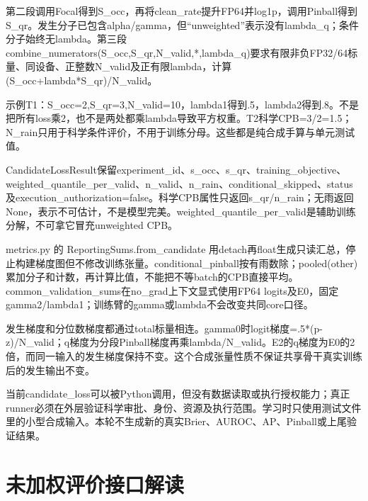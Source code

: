\documentclass[UTF8,fontset=fandol,10pt]{ctexart}
\begin{document}
第二段调用Focal得到S\_\allowbreak{}occ，再将clean\_\allowbreak{}rate提升FP64并log1p，调用Pinball得到S\_\allowbreak{}qr。发生分子已包含alpha/\allowbreak{}gamma，但“unweighted”表示没有lambda\_\allowbreak{}q；条件分子始终无lambda。第三段 combine\_\allowbreak{}numerators(S\_\allowbreak{}occ,S\_\allowbreak{}qr,N\_\allowbreak{}valid,*,lambda\_\allowbreak{}q)要求有限非负FP32/\allowbreak{}64标量、同设备、正整数N\_\allowbreak{}valid及正有限lambda，计算(S\_\allowbreak{}occ+lambda*S\_\allowbreak{}qr)/\allowbreak{}N\_\allowbreak{}valid。

示例T1：S\_\allowbreak{}occ=2,S\_\allowbreak{}qr=3,N\_\allowbreak{}valid=10，lambda1得到.5，lambda2得到.8。不是把所有loss乘2，也不是两处都乘lambda导致平方权重。T2科学CPB=3/\allowbreak{}2=1.5；N\_\allowbreak{}rain只用于科学条件评价，不用于训练分母。这些都是纯合成手算与单元测试值。

CandidateLossResult保留experiment\_\allowbreak{}id、s\_\allowbreak{}occ、s\_\allowbreak{}qr、training\_\allowbreak{}objective、weighted\_\allowbreak{}quantile\_\allowbreak{}per\_\allowbreak{}valid、n\_\allowbreak{}valid、n\_\allowbreak{}rain、conditional\_\allowbreak{}skipped、status及execution\_\allowbreak{}authorization=false。科学CPB属性只返回s\_\allowbreak{}qr/\allowbreak{}n\_\allowbreak{}rain；无雨返回None，表示不可估计，不是模型完美。weighted\_\allowbreak{}quantile\_\allowbreak{}per\_\allowbreak{}valid是辅助训练分解，不可拿它冒充unweighted CPB。

metrics.py 的 ReportingSums.from\_\allowbreak{}candidate 用detach再float生成只读汇总，停止构建梯度图但不修改训练张量。conditional\_\allowbreak{}pinball按有雨数除；pooled(other)累加分子和计数，再计算比值，不能把不等batch的CPB直接平均。common\_\allowbreak{}validation\_\allowbreak{}sums在no\_\allowbreak{}grad上下文显式使用FP64 logits及E0，固定gamma2/\allowbreak{}lambda1；训练臂的gamma或lambda不会改变共同core口径。

发生梯度和分位数梯度都通过total标量相连。gamma0时logit梯度=.5*(p-z)/\allowbreak{}N\_\allowbreak{}valid；q梯度为分段Pinball梯度再乘lambda/\allowbreak{}N\_\allowbreak{}valid。E2的q梯度为E0的2倍，而同一输入的发生梯度保持不变。这个合成张量性质不保证共享骨干真实训练后的发生输出不变。

当前candidate\_\allowbreak{}loss可以被Python调用，但没有数据读取或执行授权能力；真正runner必须在外层验证科学审批、身份、资源及执行范围。学习时只使用测试文件里的小型合成输入。本轮不生成新的真实Brier、AUROC、AP、Pinball或上尾验证结果。
\clearpage\section{未加权评价接口解读}
\end{document}
